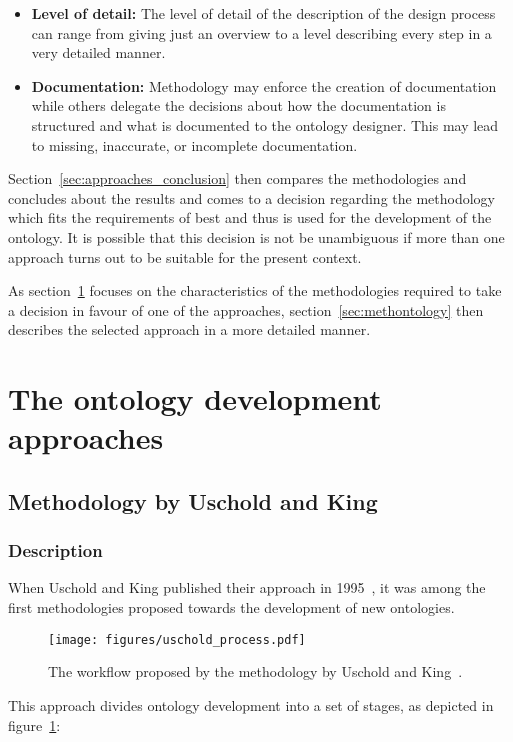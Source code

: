\begin{itemize}
\begin{itemize}
      \item \textbf{Level of detail:} The level of detail of the description of the design process can range from giving just an overview to a level describing every step in a very detailed manner.

      \item \textbf{Documentation:} Methodology may enforce the creation of documentation while others delegate the decisions about how the documentation is structured and what is documented to the ontology designer. This may lead to missing, inaccurate, or incomplete documentation.
    \end{itemize}
\end{itemize}

Section~\ref{sec:approaches_conclusion} then compares the methodologies and concludes about the results and comes to a decision regarding the methodology which fits the requirements of \smarthomeweather best and thus is used for the development of the ontology. It is possible that this decision is not be unambiguous if more than one approach turns out to be suitable for the present context.

As section~\ref{sec:ontology_approaches} focuses on the characteristics of the methodologies required to take a decision in favour of one of the approaches, section~\ref{sec:methontology} then describes the selected approach in a more detailed manner.

\section{The ontology development approaches}
\label{sec:ontology_approaches}

\subsection{Methodology by Uschold and King}
\label{subsec:approach3}

\subsubsection{Description}

When Uschold and King published their approach in 1995~\cite{UscholdKing}, it was among the first methodologies proposed towards the development of new ontologies.

\begin{figure}
\centering
\texttt{[image: figures/uschold\_process.pdf]}
\caption{The workflow proposed by the methodology by Uschold and King~\cite{UscholdKing}.}
\label{fig:uschold_process}
\end{figure}
This approach divides ontology development into a set of stages, as depicted in figure~\ref{fig:uschold_process}:

